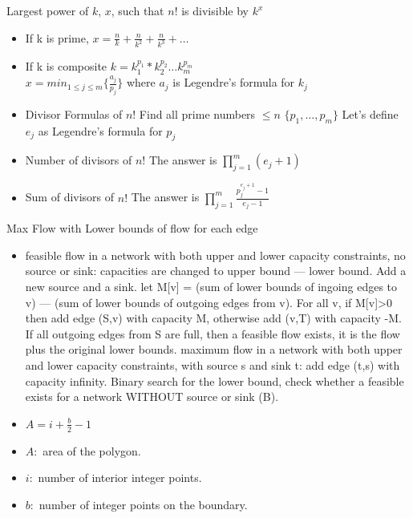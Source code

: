  Largest power of $k$, $x$, such that $n!$ is divisible by $k^x$
\begin{itemize}
\item If k is prime, $x = \frac{n}{k} + \frac{n}{k^2} +\frac{n}{k^3}+ \dots $
\item If k is composite $k =  k_1^{p_1}* k_2^{p_2}\dots k_m^{p_m} $ \\
	$ x = min_{1\leq j\leq m}\{ \frac{a_j}{p_j} \}$ where $a_j$ is Legendre's formula for $k_j$
\item Divisor Formulas of $n!$ Find all prime numbers $\leq n$ $\{ p_1, \dots, p_m \}$ Let's define $e_j$ as Legendre's formula for $p_j$
\item Number of divisors of $n!$ The answer is $\prod_{j=1}^m (e_j +1)$
\item Sum of divisors of $n!$ The answer is  $\prod_{j=1}^m \frac{p_j^{e_j+1}-1}{e_j-1}$  \\
\end{itemize}

 Max Flow with Lower bounds of flow for each edge
\begin{itemize}
\item feasible flow in a network with both upper and lower capacity constraints, no source or sink: capacities are changed to upper bound — lower bound. Add a new source and a sink. let M[v] = (sum of lower bounds of ingoing edges to v) — (sum of lower bounds of outgoing edges from v). For all v, if M[v]>0 then add edge (S,v) with capacity M, otherwise add (v,T) with capacity -M. If all outgoing edges from S are full, then a feasible flow exists, it is the flow plus the original lower bounds.
maximum flow in a network with both upper and lower capacity constraints, with source s and sink t: add edge (t,s) with capacity infinity. Binary search for the lower bound, check whether a feasible exists for a network WITHOUT source or sink (B).
\end{itemize}

\begin{itemize}
  \item $A = i+\frac{b}{2}-1$
  \item $A:$ area of the polygon.
  \item $i:$ number of interior integer points.
  \item $b:$ number of integer points on the boundary.
\end{itemize}
